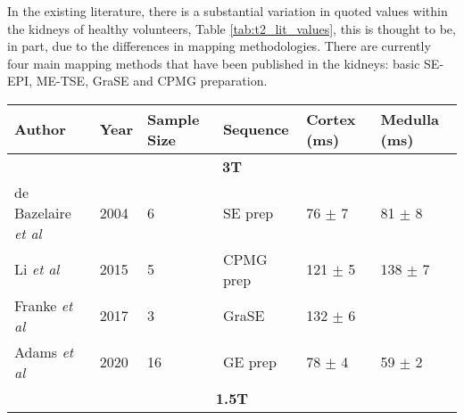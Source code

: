 In the existing literature, there is a substantial variation in quoted \ttwo values within the kidneys of healthy volunteers, Table \ref{tab:t2_lit_values}, this is thought to be, in part, due to the differences in \ttwo mapping methodologies. There are currently four main \ttwo mapping methods that have been published in the kidneys: basic \ac{SE}-\ac{EPI}, \ac{ME-TSE}, \ac{GraSE} and \ac{CPMG} \ttwo preparation. 

\begin{table}[H]
	\centering
	\begin{adjustbox}{width=1.0\textwidth, center}
	\begin{tabularx}{1.32\textwidth}{XXXXXX}
		\multicolumn{1}{l|}{Author}                                         & \multicolumn{1}{l|}{Year} & \multicolumn{1}{l|}{Sample Size} & \multicolumn{1}{l|}{Sequence}        & \multicolumn{1}{l|}{Cortex \ttwo (ms)} & Medulla \ttwo (ms) \\ \hline
		\multicolumn{6}{c}{{\textbf{3T}}}                                                                                                                                                                                                                  \\ \hline
		\multicolumn{1}{l|}{de Bazelaire \textit{et al} \cite{de_bazelaire_mr_2004}} & \multicolumn{1}{l|}{2004} & \multicolumn{1}{l|}{6}           & \multicolumn{1}{l|}{SE \ttwo prep}   & \multicolumn{1}{l|}{76 $\pm$ 7}        & 81 $\pm$ 8         \\ \hline
		\multicolumn{1}{l|}{Li \textit{et al} \cite{li_measuring_2015}}              & \multicolumn{1}{l|}{2015} & \multicolumn{1}{l|}{5}           & \multicolumn{1}{l|}{CPMG \ttwo prep} & \multicolumn{1}{l|}{121 $\pm$ 5}       & 138 $\pm$ 7        \\ \hline
		\multicolumn{1}{l|}{Franke \textit{et al} \cite{franke_magnetic_2017}}       & \multicolumn{1}{l|}{2017} & \multicolumn{1}{l|}{3}           & \multicolumn{1}{l|}{GraSE}           & \multicolumn{1}{l|}{132 $\pm$ 6}       &                    \\ \hline
		\multicolumn{1}{l|}{Adams \textit{et al} \cite{adams_multiparametric_2020}}  & \multicolumn{1}{l|}{2020} & \multicolumn{1}{l|}{16}          & \multicolumn{1}{l|}{GE \ttwo prep}   & \multicolumn{1}{l|}{78 $\pm$ 4}        & 59 $\pm$ 2         \\ \hline
		\multicolumn{6}{c}{{ \textbf{1.5T}}}                                                                                                                                                                                                                \\ \hline

\end{tabularx}
\end{adjustbox}
\end{table}
